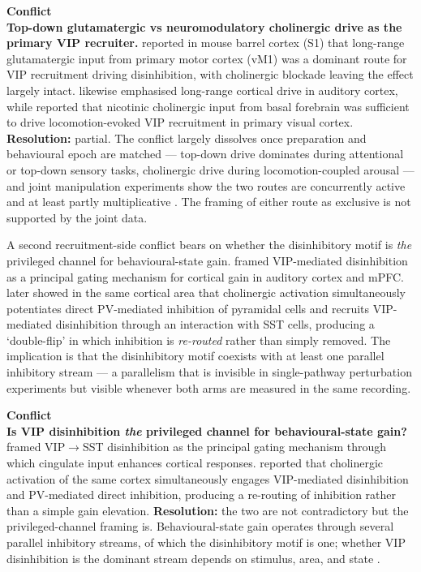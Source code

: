 \documentclass[11pt]{article}
\let\origrightarrow\rightarrow
\def\rightarrow{\ensuremath{\origrightarrow}}
\begin{document}
\begin{framed}
\textbf{Conflict}\\
\textbf{Top-down glutamatergic vs neuromodulatory cholinergic drive as the primary VIP recruiter.} \citet{Lee2013} reported in mouse barrel cortex (S1) that long-range glutamatergic input from primary motor cortex (vM1) was a dominant route for VIP recruitment driving disinhibition, with cholinergic blockade leaving the effect largely intact. \citet{Pi2013} likewise emphasised long-range cortical drive in auditory cortex, while \citet{Fu2014} reported that nicotinic cholinergic input from basal forebrain was sufficient to drive locomotion-evoked VIP recruitment in primary visual cortex. \textbf{Resolution:} partial. The conflict largely dissolves once preparation and behavioural epoch are matched --- top-down drive dominates during attentional or top-down sensory tasks, cholinergic drive during locomotion-coupled arousal --- and joint manipulation experiments \citep{Pinto2015, Kamigaki2017, Williams2019} show the two routes are concurrently active and at least partly multiplicative \citep{Hertag2019}. The framing of either route as exclusive is not supported by the joint data.
\end{framed}

A second recruitment-side conflict bears on whether the disinhibitory motif is \textit{the} privileged channel for behavioural-state gain. \citet{Pi2013} framed VIP-mediated disinhibition as a principal gating mechanism for cortical gain in auditory cortex and mPFC. \citet{Kuchibhotla2017} later showed in the same cortical area that cholinergic activation simultaneously potentiates direct PV-mediated inhibition of pyramidal cells and recruits VIP-mediated disinhibition through an interaction with SST cells, producing a `double-flip' in which inhibition is \textit{re-routed} rather than simply removed. The implication is that the disinhibitory motif coexists with at least one parallel inhibitory stream --- a parallelism that is invisible in single-pathway perturbation experiments but visible whenever both arms are measured in the same recording.

\begin{framed}
\textbf{Conflict}\\
\textbf{Is VIP disinhibition \textit{the} privileged channel for behavioural-state gain?} \citet{Pi2013} framed VIP\rightarrow SST disinhibition as the principal gating mechanism through which cingulate input enhances cortical responses. \citet{Kuchibhotla2017} reported that cholinergic activation of the same cortex simultaneously engages VIP-mediated disinhibition and PV-mediated direct inhibition, producing a re-routing of inhibition rather than a simple gain elevation. \textbf{Resolution:} the two are not contradictory but the privileged-channel framing is. Behavioural-state gain operates through several parallel inhibitory streams, of which the disinhibitory motif is one; whether VIP disinhibition is the dominant stream depends on stimulus, area, and state \citep{Pakan2016, Dipoppa2018, Veit2023}.
\end{framed}
\end{document}
